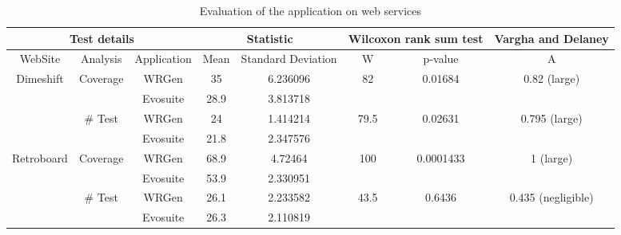 \begin{table}[H]
	\centering
	\caption{Evaluation of the application on web services}
	\label{table:res}
	\renewcommand*{\arraystretch}{1.25}
	\begin{adjustbox}{max width=\textwidth}
		\begin{tabular}{|c|c|c|c|c|c|c|c|}
			\hline
			\multicolumn{3}{|c|}{Test details} & \multicolumn{2}{c|}{Statistic} & \multicolumn{2}{c|}{Wilcoxon rank sum test} & Vargha and Delaney    \\
			\hline
			WebSite & Analysis & Application & Mean   & Standard Deviation   & W                               & p-value                             & A            			         \\
			\hline
			\multirow{4}{*}{Dimeshift}& \multirow{2}{*}{Coverage} & WRGen       & 35     & 6.236096             & \multirow{2}{*}{82}             & \multirow{2}{*}{0.01684}            & \multirow{2}{*}{0.82 (large)}  \\
			\cline{3-5}
			& & Evosuite    & 28.9   & 3.813718             &                                 &                                     &            			   		 \\
			\cline{2-8}
			& \multirow{2}{*}{\# Test} & WRGen       & 24     & 1.414214             & \multirow{2}{*}{79.5}           & \multirow{2}{*}{0.02631}            & \multirow{2}{*}{0.795 (large)}  \\
			\cline{3-5}
			& & Evosuite    & 21.8   & 2.347576             &                                 &                                     &            			   		 \\
			\hline
			\multirow{4}{*}{Retroboard}& \multirow{2}{*}{Coverage} & WRGen       & 68.9     & 4.72464             & \multirow{2}{*}{100}             & \multirow{2}{*}{0.0001433}            & \multirow{2}{*}{1 (large)}  \\
			\cline{3-5}
			& & Evosuite    & 53.9   & 2.330951            &                                 &                                     &            			   		 \\
			\cline{2-8}
			& \multirow{2}{*}{\# Test} & WRGen       & 26.1     & 2.233582             & \multirow{2}{*}{43.5}             & \multirow{2}{*}{0.6436}            & \multirow{2}{*}{0.435 (negligible)}  \\
			\cline{3-5}
			& & Evosuite    & 26.3   & 2.110819             &                                 &                                     &            			   		 \\

\end{tabular}
\end{adjustbox}
\end{table}
